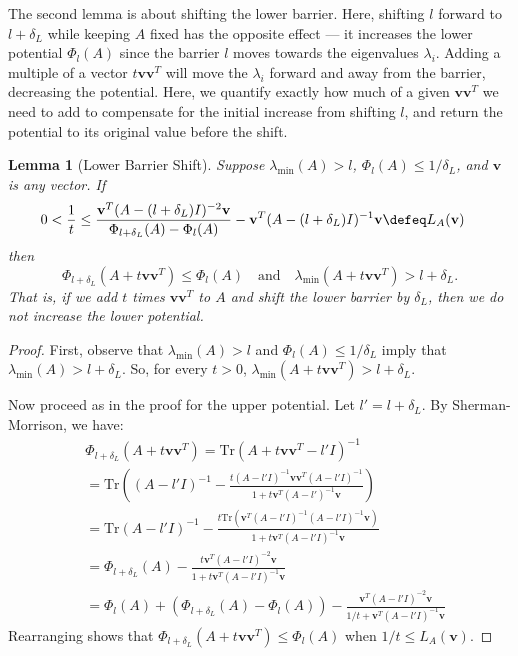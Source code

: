 \documentclass[12pt]{article}
\renewcommand{\v}{\mathbf{v}}
\newtheorem{lemma}[theorem]{Lemma}
\renewcommand{\v}{\mathbf{v}}
\newcommand{\lmin}{\lambda_\mathrm{min}}
\newcommand{\deltaL}{\delta_{L}}
\newcommand{\tr}{\mathrm{Tr}}
\newcommand\ppi{\mathbf{v}}
\begin{document}
The second lemma is about shifting the lower barrier.
Here, shifting $l$ forward to $l+\deltaL$ while keeping $A$ fixed has the
opposite effect --- it 
  increases the lower potential $\Phi_l(A)$ since the barrier $l$ moves 
  towards the eigenvalues $\lambda_i$.
Adding a multiple of a vector $t\v\v^T$ will move the $\lambda_i$ forward and away
  from the barrier, decreasing the potential.
Here, we quantify exactly how much of a given $\v\v^T$ we need to add 
  to compensate for the initial increase from shifting $l$, and return the potential to 
  its original value before the shift. 
\begin{lemma}[Lower Barrier Shift]\label{lem:lowerupd} Suppose $\lmin(A)>l$,
  $\Phi_{l} (A) \leq 1/\deltaL$,
  and $\ppi$ is any vector. If
\begin{align*} 0 < \frac{1}{t} &\le 
\frac{\ppi^{T} (A-(l+\deltaL)I)^{-2}\ppi}
  {\Phi_{l+\deltaL}(A)-\Phi_l(A)}
  -\ppi^{T} (A-(l+\deltaL)I)^{-1}\ppi
  \defeq L_A(\ppi)\end{align*}
then 
\[ \Phi_{l+\deltaL}(A+t\ppi\ppi^{T} )\le\Phi_l(A)
\quad \text{and} \quad 
\lmin(A+t\ppi\ppi^{T} )> l+\deltaL.\]
That is, if we add $t$ times $\ppi\ppi^{T} $ to $A$ and shift the lower barrier by
$\deltaL$, then we do not increase the lower potential.
\end{lemma}
\begin{proof} 
First, observe that $\lmin(A)>l$ and  $\Phi_{l} (A) \leq 1/\deltaL$
  imply that $\lmin (A) > l + \deltaL$.
So, for every $t > 0$, $\lmin(A+t\ppi\ppi^{T} )> l+\deltaL$.

Now proceed as in the proof for the upper potential. Let $l'=l+\deltaL$.
By Sherman-Morrison, we have:
\begin{align*}
&\Phi_{l+\deltaL}(A+t\ppi\ppi^{T} )=\tr(A+t\ppi\ppi^{T} -l'I)^{-1}
\\&=\tr\left((A-l'I)^{-1}-\frac{t(A-l'I)^{-1}\ppi\ppi^{T} (A-l'I)^{-1}}{1+t\ppi^{T} (A-l')^{-1}\ppi}\right)
\\&=\tr(A-l'I)^{-1}-\frac{t\tr(\ppi^{T} (A-l'I)^{-1}(A-l'I)^{-1}\ppi)}{1+t\ppi^{T} (A-l'I)^{-1}\ppi}
\\&=\Phi_{l+\deltaL}(A)-\frac{t\ppi^{T} (A-l'I)^{-2}\ppi}{1+t\ppi^{T} (A-l'I)^{-1}\ppi}
\\&=\Phi_{l}(A)+(\Phi_{l+\deltaL}(A)-\Phi_{l}(A))-\frac{\ppi^{T} (A-l'I)^{-2}\ppi}{1/t+\ppi^{T} (A-l'I)^{-1}\ppi}
\end{align*}
Rearranging shows that $\Phi_{l+\deltaL}(A+t\ppi\ppi^{T} )\le\Phi_l(A)$ when $1/t\le
L_A(\ppi)$.
\end{proof}
\end{document}
